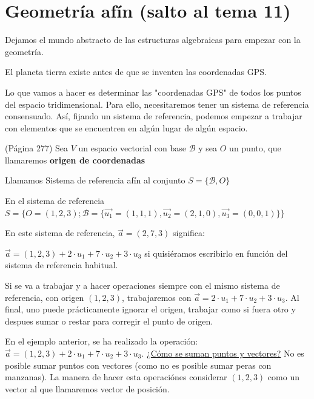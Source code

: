 
\section{Geometría afín (salto al tema 11)}

Dejamos el mundo abstracto de las estructuras algebraicas para empezar con la geometría. 

El planeta tierra existe antes de que se inventen las coordenadas GPS. 


Lo que vamos a hacer es determinar las "coordenadas GPS" de todos los puntos del espacio tridimensional.
%
Para ello, necesitaremos tener un sistema de referencia consensuado.
%
Así, fijando un sistema de referencia, podemos empezar a trabajar con elementos que se encuentren en algún lugar de algún espacio. 



\begin{defn} (Página 277)
Sea $V$ un espacio vectorial con base $\mathcal{B}$ y sea $O$ un punto, que llamaremos \textbf{origen de coordenadas}

Llamamos Sistema de referencia afín al conjunto $S = \{\mathcal{B},O\}$
\end{defn}

\begin{example}
En el sistema de referencia $S=\{O = (1,2,3); \mathcal{B} = \{\vec{u_1} = (1,1,1), \vec{u_2} = (2,1,0), \vec{u_3} = (0,0,1)\}\}$

En este sistema de referencia, $\vec{a} = (2,7,3)$ significa:

$\vec{a} =  (1,2,3) + 2\cdot u_1 + 7\cdot u_2 + 3\cdot u_3$ si quisiéramos escribirlo en función del sistema de referencia habitual.

\label{example::origen_ref}

Si se va a trabajar y a hacer operaciones siempre con el mismo sistema de referencia, con origen $(1,2,3)$, trabajaremos con $\vec{a} = 2\cdot u_1 + 7\cdot u_2 + 3\cdot u_3$.
%
Al final, uno puede prácticamente ignorar el origen, trabajar como si fuera otro y despues sumar o restar para corregir el punto de origen.

\end{example}
\obs En el ejemplo anterior, se ha realizado la operación: $\vec{a} =  (1,2,3) + 2·u_1 + 7·u_2 + 3·u_3$. \ul{¿Cómo se suman puntos y vectores?} 
%
No es posible sumar puntos con vectores (como no es posible sumar peras con manzanas). La manera de hacer esta operaciónes considerar $(1,2,3)$ como un vector al que llamaremos vector de posición.


